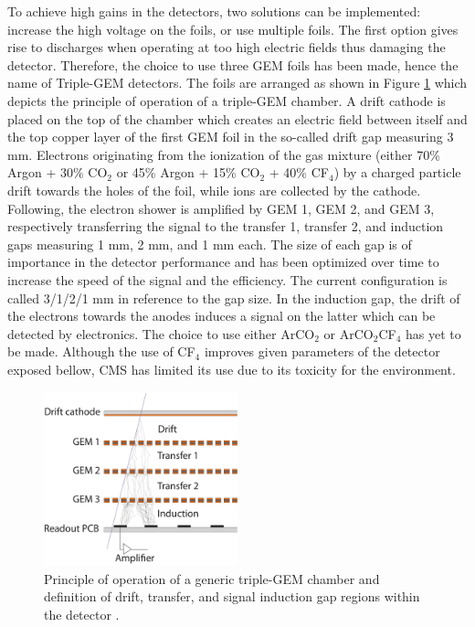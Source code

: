     To achieve high gains in the detectors, two solutions can be implemented: increase the high voltage on the foils, or use multiple foils. The first option gives rise to discharges when operating at too high electric fields thus damaging the detector. Therefore, the choice to use three GEM foils has been made, hence the name of Triple-GEM detectors. The foils are arranged as shown in Figure \ref{fig:II-1-triple} which depicts the principle of operation of a triple-GEM chamber. A drift cathode is placed on the top of the chamber which creates an electric field between itself and the top copper layer of the first GEM foil in the so-called drift gap measuring 3 mm. Electrons originating from the ionization of the gas mixture (either 70\% Argon + 30\% CO$_2$ or 45\% Argon + 15\% CO$_2$ + 40\% CF$_4$) by a charged particle drift towards the holes of the foil, while ions are collected by the cathode. Following, the electron shower is amplified by GEM 1, GEM 2, and GEM 3, respectively transferring the signal to the transfer 1, transfer 2, and induction gaps measuring 1 mm, 2 mm, and 1 mm each. The size of each gap is of importance in the detector performance and has been optimized over time to increase the speed of the signal and the efficiency. The current configuration is called 3/1/2/1 mm in reference to the gap size. In the induction gap, the drift of the electrons towards the anodes induces a signal on the latter which can be detected by electronics. The choice to use either ArCO$_2$ or ArCO$_2$CF$_4$ has yet to be made. Although the use of CF$_4$ improves given parameters of the detector exposed bellow, CMS has limited its use due to its toxicity for the environment. \\

    \begin{figure}[h!]
      \centering
      \includegraphics[width=0.5\textwidth]{img/II-1-gem/triple-gem-foils.pdf}
      \caption{Principle of operation of a generic triple-GEM chamber and definition of drift, transfer, and signal induction gap regions within the detector \cite{Colaleo:2021453}.}
      \label{fig:II-1-triple}
    \end{figure}


